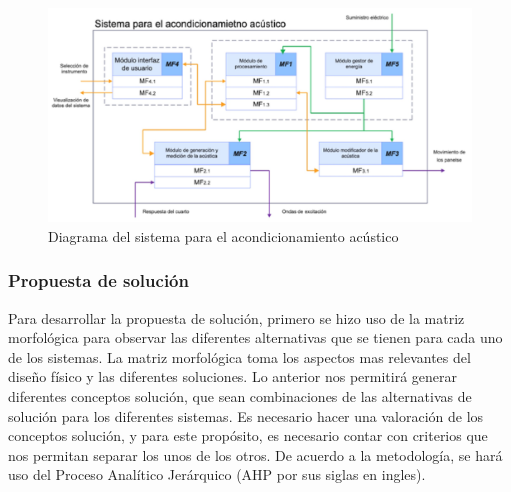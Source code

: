 \begin{figure}[!htb]
    \centering
    \includegraphics[width=1\textwidth]{imagenes/sistema para acondicionamiento.jpg}
    \caption{\footnotesize Diagrama del sistema para el acondicionamiento ac\'ustico}
    \label{fig:DiagramaSistema}
\end{figure}
\FloatBarrier

\subsubsection{Propuesta de solución}
Para desarrollar la propuesta de solución, primero se hizo uso de la matriz morfológica para observar las diferentes alternativas que se tienen para cada uno de los sistemas. La matriz morfológica toma los aspectos mas relevantes del diseño físico y las diferentes soluciones. Lo anterior nos permitirá generar diferentes conceptos solución, que sean combinaciones de las alternativas de solución para los diferentes sistemas.
Es necesario hacer una valoración de los conceptos solución, y para este propósito, es necesario contar con criterios que nos permitan separar los unos de los otros. De acuerdo a la metodología, se hará uso del Proceso Analítico Jerárquico (AHP por sus siglas en ingles).

